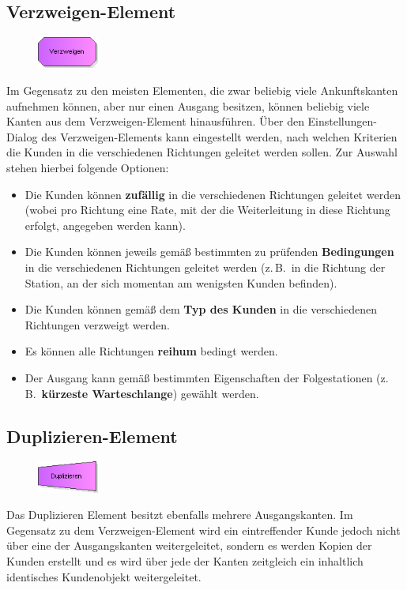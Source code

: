 \documentclass[deutsch]{svmono}
\begin{document}
\vfill
\pagebreak

\subsection*{Verzweigen-Element}

\begin{figure}
\vspace{-22pt}
\includegraphics[width=2cm]{IconDecide.png}
\vspace{-22pt}
\end{figure}
Im Gegensatz zu den meisten Elementen, die zwar beliebig viele Ankunftskanten aufnehmen können, aber nur einen Ausgang besitzen, können beliebig viele Kanten aus dem Verzweigen-Element hinausführen. Über den Einstellungen-Dialog des Verzweigen-Elements kann eingestellt werden, nach welchen Kriterien die Kunden in die verschiedenen Richtungen geleitet werden sollen. Zur Auswahl stehen hierbei folgende Optionen:
\begin{itemize}
\item
Die Kunden können \textbf{zufällig} in die verschiedenen Richtungen geleitet werden (wobei pro Richtung eine Rate, mit der die Weiterleitung in diese Richtung erfolgt, angegeben werden kann).
\item
Die Kunden können jeweils gemäß bestimmten zu prüfenden \textbf{Bedingungen} in die verschiedenen Richtungen geleitet werden (z.\,B.\ in die Richtung der Station, an der sich momentan am wenigsten Kunden befinden).
\item
Die Kunden können gemäß dem \textbf{Typ des Kunden} in die verschiedenen Richtungen verzweigt werden.
\item
Es können alle Richtungen \textbf{reihum} bedingt werden.
\item
Der Ausgang kann gemäß bestimmten Eigenschaften der Folgestationen (z.\,B.\ \textbf{kürzeste Warteschlange}) gewählt werden.
\end{itemize}

\subsection*{Duplizieren-Element}

\begin{figure}
\vspace{-22pt}
\includegraphics[width=2cm]{IconDuplicate.png}
\vspace{-22pt}
\end{figure}
Das Duplizieren Element besitzt ebenfalls mehrere Ausgangskanten. Im Gegensatz zu dem Verzweigen-Element wird ein eintreffender Kunde jedoch nicht über eine der Ausgangskanten weitergeleitet, sondern es werden Kopien der Kunden erstellt und es wird über jede der Kanten zeitgleich ein inhaltlich identisches Kundenobjekt weitergeleitet.
\end{document}
